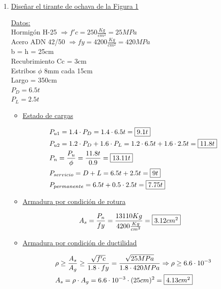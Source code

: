\begin{enumerate}
\item \underline{Diseñar el tirante de ochava de la Figura 1}

\underline{Datos:}\\
Hormigón H-25 $\Rightarrow f'c = 250 \frac{Kg}{cm^2} = 25 MPa$\\
Acero ADN 42/50 $\Rightarrow fy = 4200 \frac{Kg}{cm^2} = 420 MPa$\\
b = h = 25cm\\
Recubrimiento Cc = 3cm\\
Estribos $\phi$ 8mm cada 15cm\\
Largo = 350cm\\
$P_D = 6.5t$\\
$P_L = 2.5t$\\

\begin{itemize}
\item \underline{Estado de cargas}

\begin{align*}
& P_{u1} = 1.4 \cdot P_D = 1.4 \cdot 6.5 t = \framebox{$9.1t$}\\
& P_{u2} = 1.2 \cdot P_D + 1.6 \cdot P_L = 1.2 \cdot 6.5 t + 1.6 \cdot 2.5 t = \framebox{$11.8t$}\\
& P_n = \frac{P_u}{\phi} = \frac{11.8 t}{0.9} = \framebox{$13.11t$}\\
& P_{servicio} = D + L = 6.5t + 2.5t = \framebox{$9t$}\\
& P_{permanente} = 6.5t + 0.5 \cdot 2.5t = \framebox{$7.75t$}
\end{align*}

\item \underline{Armadura por condición de rotura}

\begin{align*}
& A_s = \frac{P_n}{fy} = \frac{13110 Kg}{4200 \frac{Kg}{cm^2}} = \framebox{$3.12 cm^2$}
\end{align*}

\item \underline{Armadura por condición de ductilidad}

\begin{align*}
& \rho \geq \frac{A_s}{A_g} \geq \frac{\sqrt{f'c}}{1.8 \cdot fy} = \frac{\sqrt{25MPa}}{1.8 \cdot 420MPa} \Rightarrow \rho \geq 6.6 \cdot 10^{-3}\\
& A_s = \rho \cdot A_g = 6.6 \cdot 10^{-3} \cdot (25cm)^2 = \framebox{$4.13 cm^2$}
\end{align*}


\end{itemize}
\end{enumerate}
